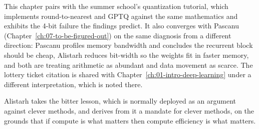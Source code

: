 This chapter pairs with the summer school's quantization tutorial, which implements
round-to-nearest and GPTQ against the same mathematics and exhibits the 4-bit failure the findings
predict. It also converges
with Pascanu (Chapter~\ref{ch:07-to-be-figured-out}) on the same diagnosis from a different
direction: Pascanu profiles memory bandwidth and concludes the recurrent block should be cheap,
Alistarh reduces bit-width so the weights fit in faster memory, and both are treating arithmetic
as abundant and data movement as scarce. The lottery ticket citation is shared with
Chapter~\ref{ch:01-intro-deep-learning} under a different interpretation, which is noted there.

\begin{aside}
Alistarh takes the bitter lesson, which is normally deployed as an argument against clever
methods, and derives from it a mandate for clever methods, on the grounds that if compute is what
matters then compute efficiency is what matters.
\end{aside}
